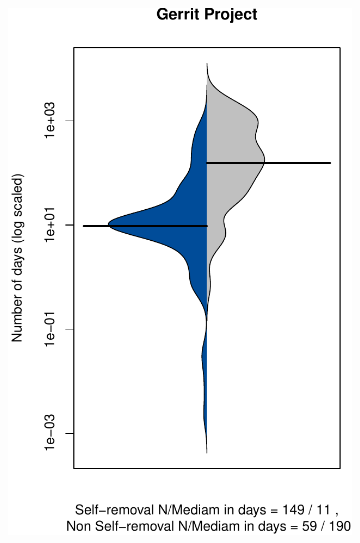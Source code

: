 \begin{figure}[t]
\begin{subfigure}[b]{0.193\textwidth}
		\includegraphics[width=\textwidth]{figures/test/Gerrit.pdf}
		\label{fig:removal_comparison_gerrit} 
	\end{subfigure}
	\begin{subfigure}[b]{0.195\textwidth}

\end{subfigure}
\end{figure}
